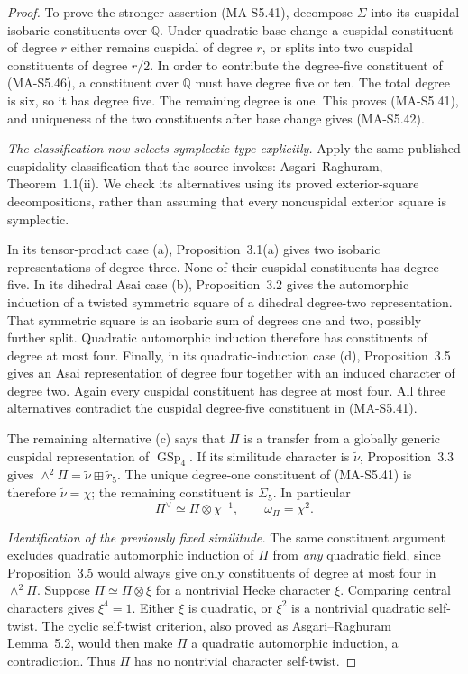 \begin{proof}
To prove the stronger assertion (MA-S5.41), decompose
$\Sigma$ into its cuspidal isobaric constituents over
$\mathbb Q$.  Under quadratic base change a cuspidal
constituent of degree $r$ either remains cuspidal of
degree $r$, or splits into two cuspidal constituents of
degree $r/2$.  In order to contribute the degree-five
constituent of (MA-S5.46), a constituent over $\mathbb Q$
must have degree five or ten.  The total degree is six,
so it has degree five.  The remaining degree is one.
This proves (MA-S5.41), and uniqueness of the two
constituents after base change gives (MA-S5.42).

\emph{The classification now selects symplectic type explicitly.}
Apply the same published cuspidality classification that
the source invokes: Asgari--Raghuram, Theorem~1.1(ii).
We check its alternatives using its proved exterior-square
decompositions, rather than assuming that every noncuspidal
exterior square is symplectic.

In its tensor-product case (a), Proposition~3.1(a) gives
two isobaric representations of degree three.  None of
their cuspidal constituents has degree five.
In its dihedral Asai case (b), Proposition~3.2 gives
the automorphic induction of a twisted symmetric square
of a dihedral degree-two representation.  That symmetric
square is an isobaric sum of degrees one and two, possibly
further split.  Quadratic automorphic induction therefore
has constituents of degree at most four.
Finally, in its quadratic-induction case (d), Proposition~3.5
gives an Asai representation of degree four together with
an induced character of degree two.  Again every cuspidal
constituent has degree at most four.
All three alternatives contradict the cuspidal degree-five
constituent in (MA-S5.41).

The remaining alternative (c) says that $\Pi$ is a
transfer from a globally generic cuspidal representation
of $\operatorname{GSp}_4$.  If its similitude character
is $\widetilde\nu$, Proposition~3.3 gives
$\wedge^2\Pi=\widetilde\nu\boxplus\widetilde r_5$.
The unique degree-one constituent of (MA-S5.41) is
therefore $\widetilde\nu=\chi$; the remaining constituent
is $\Sigma_5$.  In particular
\[
                 \Pi^\vee\simeq\Pi\otimes\chi^{-1},
                 \qquad \omega_\Pi=\chi^2.
 \tag{MA-S5.48}
\]

\emph{Identification of the previously fixed similitude.}
The same constituent argument excludes quadratic
automorphic induction of $\Pi$ from \emph{any} quadratic
field, since Proposition~3.5 would always give only
constituents of degree at most four in $\wedge^2\Pi$.
Suppose $\Pi\simeq\Pi\otimes\xi$ for a nontrivial
Hecke character $\xi$.  Comparing central characters
gives $\xi^4=1$.  Either $\xi$ is quadratic, or
$\xi^2$ is a nontrivial quadratic self-twist.
The cyclic self-twist criterion, also proved as
Asgari--Raghuram Lemma~5.2, would then make $\Pi$ a
quadratic automorphic induction, a contradiction.
Thus $\Pi$ has no nontrivial character self-twist.


\end{proof}
